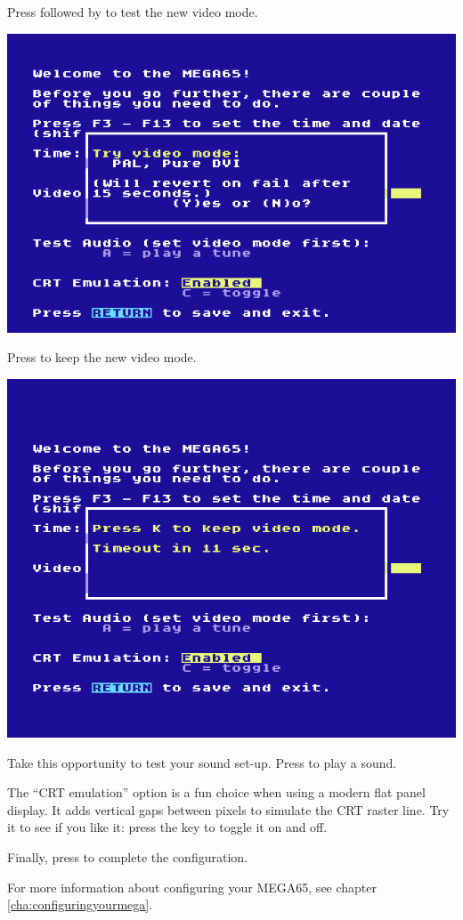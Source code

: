 Press  followed by  to test the new video mode.

\begin{center}
  \includegraphics[width=0.7\linewidth]{images/img011_final_boot_03.png}
\end{center}

Press  to keep the new video mode.

\begin{center}
  \includegraphics[width=0.7\linewidth]{images/img011_final_boot_04.png}
\end{center}

Take this opportunity to test your sound set-up. Press  to play a sound.

The ``CRT emulation'' option is a fun choice when using a modern flat panel display. It adds vertical gaps between pixels to simulate the CRT raster line. Try it to see if you like it: press the  key to toggle it on and off.

Finally, press  to complete the configuration.

For more information about configuring your MEGA65, see chapter \vref{cha:configuringyourmega}.

